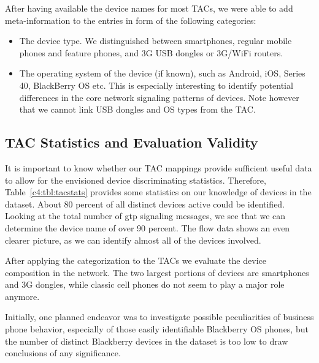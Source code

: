After having available the device names for most \glspl{TAC}, we were able to add meta-information to the entries in form of the following categories:

\begin{itemize}
\item The device type. We distinguished between smartphones, regular mobile phones and feature phones, and 3G USB dongles or 3G/WiFi routers.

\item The operating system of the device (if known), such as Android, iOS, Series 40, BlackBerry OS etc. This is especially interesting to identify potential differences in the core network signaling patterns of devices. Note however that we cannot link USB dongles and OS types from the \gls{TAC}.

\end{itemize}


\subsection{TAC Statistics and Evaluation Validity}

It is important to know whether our \gls{TAC} mappings provide sufficient useful data to allow for the envisioned device discriminating statistics. Therefore, Table~\ref{c4:tbl:tacstats} provides some statistics on our knowledge of devices in the dataset. About 80 percent of all distinct devices active could be identified. Looking at the total number of \gls{gtp} signaling messages, we see that we can determine the device name of over 90 percent.
The flow data shows an even clearer picture, as we can identify almost all of the devices involved.


After applying the categorization to the \glspl{TAC} we evaluate the device composition in the network. The two largest portions of devices are smartphones  and 3G dongles, while classic cell phones do not seem to play a major role anymore. 


Initially, one planned endeavor was to investigate possible peculiarities of business phone behavior, especially of those easily identifiable Blackberry OS phones, but the number of distinct Blackberry devices in the dataset is too low to draw conclusions of any significance.

